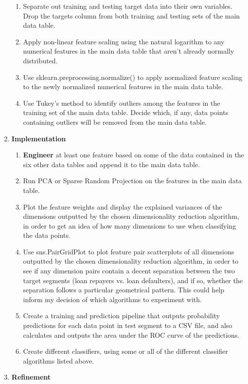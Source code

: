 \documentclass[12pt, letterpaper]{article}
\begin{document}
\begin{enumerate}
\begin{enumerate}
      \item Separate out training and testing target data into their own variables. Drop the targets column from both training and testing sets of the main data table.
      \item Apply non-linear feature scaling using the natural logarithm to any numerical features in the main data table that aren't already normally distributed.
      \item Use sklearn.preprocessing.normalize() to apply normalized feature scaling to the newly normalized numerical features in the main data table.
      \item Use Tukey's method to identify outliers among the features in the training set of the main data table. Decide which, if any, data points containing outliers will be removed from the main data table.
    \end{enumerate}
  \item \textbf{Implementation}
    \begin{enumerate}
      \item \textbf{Engineer} at least one feature based on some of the data contained in the six other data tables and append it to the main data table.
      \item Run PCA or Sparse Random Projection on the features in the main data table.
      \item Plot the feature weights and display the explained variances of the dimensions outputted by the chosen dimensionality reduction algorithm, in order to get an idea of how many dimensions to use when classifying the data points.
      \item Use sns.PairGridPlot to plot feature pair scatterplots of all dimensions outputted by the chosen dimensionality reduction algorithm, in order to see if any dimension pairs contain a decent separation between the two target segments (loan repayers vs. loan defaulters), and if so, whether the separation follows a particular geometrical pattern. This could help inform my decision of which algorithms to experiment with.
      \item Create a training and prediction pipeline that outputs probability predictions for each data point in test segment to a CSV file, and also calculates and outputs the area under the ROC curve of the predictions.
      \item Create different classifiers, using some or all of the different classifier algorithms listed above.
    \end{enumerate}
  \item \textbf{Refinement}

\end{enumerate}
\end{document}
